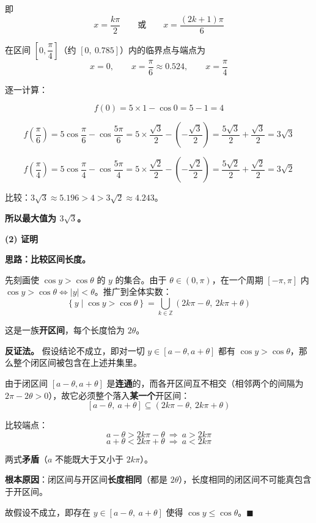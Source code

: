 即
\[x=\frac{k\pi}{2}\qquad\text{或}\qquad x=\frac{(2k+1)\pi}{6}\]

在区间 $\left[0,\dfrac\pi4\right]$（约 $[0,\ 0.785]$）内的临界点与端点为
\[x=0,\qquad x=\frac\pi6\approx0.524,\qquad x=\frac\pi4\]

逐一计算：

\[f(0)=5\times1-\cos0=5-1=4\]

\[f\left(\frac\pi6\right)=5\cos\frac\pi6-\cos\frac{5\pi}6=5\times\frac{\sqrt3}{2}-\left(-\frac{\sqrt3}{2}\right)=\frac{5\sqrt3}{2}+\frac{\sqrt3}{2}=3\sqrt3\]

\[f\left(\frac\pi4\right)=5\cos\frac\pi4-\cos\frac{5\pi}4=5\times\frac{\sqrt2}{2}-\left(-\frac{\sqrt2}{2}\right)=\frac{5\sqrt2}{2}+\frac{\sqrt2}{2}=3\sqrt2\]

比较：$3\sqrt3\approx5.196>4>3\sqrt2\approx4.243$。

\textbf{所以最大值为 $3\sqrt3$。}

\par\medskip

\textbf{(2) 证明}

\textbf{思路：比较区间长度。}

先刻画使 $\cos y>\cos\theta$ 的 $y$ 的集合。由于 $\theta\in(0,\pi)$，在一个周期 $[-\pi,\pi]$ 内 $\cos y>\cos\theta\iff|y|<\theta$。推广到全体实数：
\[\left\{y\mid\cos y>\cos\theta\right\}=\bigcup_{k\in\mathbb Z}\left(2k\pi-\theta,\ 2k\pi+\theta\right)\]

这是一族\textbf{开区间}，每个长度恰为 $2\theta$。

\textbf{反证法。} 假设结论不成立，即对一切 $y\in[a-\theta,a+\theta]$ 都有 $\cos y>\cos\theta$，那么整个闭区间被包含在上述并集里。

由于闭区间 $[a-\theta,a+\theta]$ 是\textbf{连通}的，而各开区间互不相交（相邻两个的间隔为 $2\pi-2\theta>0$），故它必须整个落入\textbf{某一个}开区间：
\[[a-\theta,\ a+\theta]\subseteq\left(2k\pi-\theta,\ 2k\pi+\theta\right)\]

比较端点：
\[a-\theta>2k\pi-\theta\ \Longrightarrow\ a>2k\pi\]
\[a+\theta<2k\pi+\theta\ \Longrightarrow\ a<2k\pi\]

两式\textbf{矛盾}（$a$ 不能既大于又小于 $2k\pi$）。

\textbf{根本原因}：闭区间与开区间\textbf{长度相同}（都是 $2\theta$），长度相同的闭区间不可能真包含于开区间。

故假设不成立，即存在 $y\in[a-\theta,\ a+\theta]$ 使得 $\cos y\le\cos\theta$。$\blacksquare$

\par\medskip

